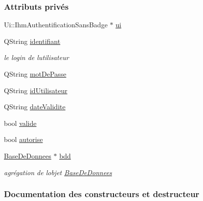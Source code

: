 \subsubsection*{Attributs privés}
\begin{DoxyCompactItemize}
\item 
Ui\+::\+Ihm\+Authentification\+Sans\+Badge $\ast$ \hyperlink{class_ihm_authentification_sans_badge_a95e8a9d049b6e5f262b45e3362d2bbee}{ui}
\item 
Q\+String \hyperlink{class_ihm_authentification_sans_badge_aff90fe3fcf957daa57ca0318a4b1a2d0}{identifiant}
\begin{DoxyCompactList}\small\item\em le login de l\textquotesingle{}utilisateur \end{DoxyCompactList}\item 
Q\+String \hyperlink{class_ihm_authentification_sans_badge_a3a5c5887be56c7f1b5dcd1bf824d09c4}{mot\+De\+Passe}
\item 
Q\+String \hyperlink{class_ihm_authentification_sans_badge_a2ff19fe279947b469dbc48b6ff2db187}{id\+Utilisateur}
\item 
Q\+String \hyperlink{class_ihm_authentification_sans_badge_afd0f3b5e59208d58be78f0cb741d4be7}{date\+Validite}
\item 
bool \hyperlink{class_ihm_authentification_sans_badge_a653eb9abd54ba736b3d98b994a7e4f1f}{valide}
\item 
bool \hyperlink{class_ihm_authentification_sans_badge_a53848cfd67449089f20c1d0c6df8e340}{autorise}
\item 
\hyperlink{class_base_de_donnees}{Base\+De\+Donnees} $\ast$ \hyperlink{class_ihm_authentification_sans_badge_acf93b261335b6128af77de61994b9491}{bdd}
\begin{DoxyCompactList}\small\item\em agrégation de l\textquotesingle{}objet \hyperlink{class_base_de_donnees}{Base\+De\+Donnees} \end{DoxyCompactList}\end{DoxyCompactItemize}


\subsubsection{Documentation des constructeurs et destructeur}
\mbox{\label{class_ihm_authentification_sans_badge_aace6d9eebcab9fee429fe9dbb6840f15}} 
